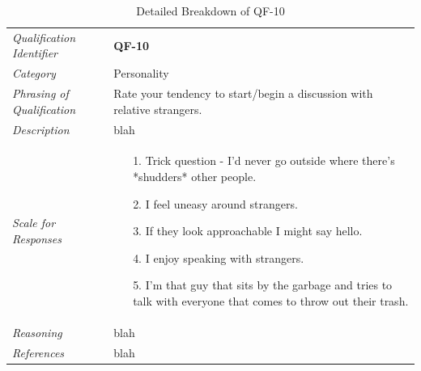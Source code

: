 \documentclass[12pt,letterpaper]{article}
\begin{document}
\begin{table}[H]
	\caption{Detailed Breakdown of QF-10}
	\begin{tabu} to 
		\toprule
		Qualification Identifier & {\bf QF-10}\\
		Category & Personality \\
		Phrasing of Qualification & Rate your tendency to start/begin a discussion with relative strangers. \\
		Description & blah\\
		Scale for Responses &
		\begin{minipage}[t]{\linewidth}
			\begin{enumerate}
				\item[1.] Trick question - I'd never go outside where there's *shudders* other people.
				\item[2.] I feel uneasy around strangers.
				\item[3.] If they look approachable I might say hello.
				\item[4.] I enjoy speaking with strangers.
				\item[5.] I'm that guy that sits by the garbage and tries to talk with everyone that comes to throw out their trash.
			\end{enumerate}
		\end{minipage}\\
		Reasoning & blah\\
		References & blah\\
		\toprule
	\end{tabu}
\end{table}
\end{document}
